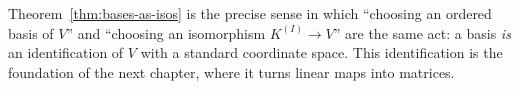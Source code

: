 \begin{remark}
    Theorem~\ref{thm:bases-as-isos} is the precise sense in which ``choosing an ordered basis of $V$''
    and ``choosing an isomorphism $K^{(I)} \to V$'' are the same act: a basis \emph{is} an
    identification of $V$ with a standard coordinate space. This identification is the foundation of the
    next chapter, where it turns linear maps into matrices.
\end{remark}
